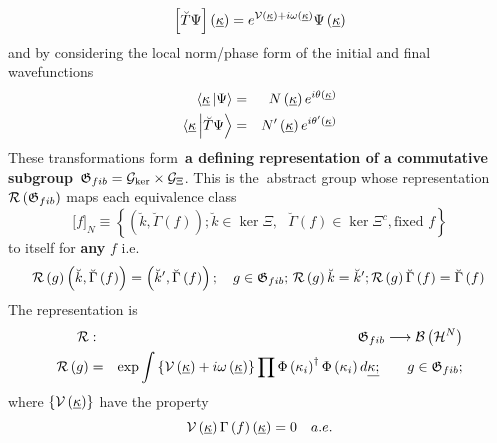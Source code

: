 \begin{equation}
\left[ \breve{T}\Psi \right] \left( \underline{\kappa }\right) =e^{{\cal V}%
\left( \underline{\kappa }\right) +i\omega \left( \underline{\kappa }\right)
}\Psi \left( \underline{\kappa }\right)
\end{equation}%
and by considering the local norm/phase form of the initial and final
wavefunctions%
\begin{eqnarray}
\langle \underline{\kappa }\left| \Psi \right\rangle &=&N\left( \underline{%
\kappa }\right) e^{i\theta \left( \underline{\kappa }\right) } \\
\langle \underline{\kappa }\left| \breve{T}\Psi \right\rangle &=&N^{\prime
}\left( \underline{\kappa }\right) e^{i\theta ^{\prime }\left( \underline{%
\kappa }\right) }
\end{eqnarray}%
These transformations form{\it \ }{\bf a defining representation of a
commutative subgroup}{\it \ }${\frak G}_{fib}={\cal G}_{\ker }\times {\cal G}%
_{\Xi }$. This is the{\bf \ }abstract group whose representation ${\cal R}%
\left( {\frak G}_{fib}\right) $ maps each equivalence class 
\begin{equation}
\lbrack f]_{N}\equiv \left\{ \left( \breve{k},\breve{\Gamma}\left( f\right)
\right) ;\breve{k}\in \ker \Xi ,\text{ }\breve{\Gamma}\left( f\right) \in
\ker \Xi ^{c},\text{fixed }f\right\}
\end{equation}%
to itself for {\bf any }$f$ i.e. 
\begin{equation}
{\cal R}\left( g\right) \left( \breve{k},\breve{\Gamma}\left( f\right)
\right) =\left( \breve{k}^{\prime },\breve{\Gamma}\left( f\right) \right)
;\quad g\in {\frak G}_{fib};\,{\cal R}\left( g\right) \breve{k}=\breve{k}%
^{\prime };{\cal R}\left( g\right) \breve{\Gamma}\left( f\right) =\breve{%
\Gamma}\left( f\right) \,
\end{equation}%
The representation is 
\begin{eqnarray}
{\cal R} &:&{\frak G}_{fib}\longrightarrow {\cal B}\left( {\cal H}^{N}\right)
\nonumber \\
{\cal R}\left( g\right) &=&\exp \int \left\{ {\cal V}\left( \underline{%
\kappa }\right) +i\omega \left( \underline{\kappa }\right) \right\} \prod
\Phi \left( \kappa _{i}\right) ^{\dagger }\Phi \left( \kappa _{i}\right) d%
\underline{\kappa ;}\qquad g\in {\frak G}_{fib};
\end{eqnarray}%
where $\left\{ {\cal V}\left( \underline{\kappa }\right) \right\} $ have the
property 
\begin{equation}
{\cal V}\left( \underline{\kappa }\right) \Gamma \left( f\right) \left( 
\underline{\kappa }\right) =0\quad a.e.
\end{equation}%
